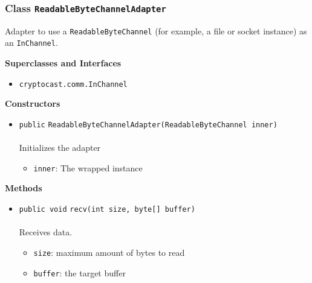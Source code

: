 \subsubsection{Class \lstinline|ReadableByteChannelAdapter|}
Adapter to use a \lstinline|ReadableByteChannel| (for example, a file or socket instance) as an
 \lstinline|InChannel|. \\
\noindent\begin{minipage}[t]{5cm}
\vspace{0.3em}
\hspace*{2em}
\vspace{0.3em}
\end{minipage}



\textbf{\sffamily Superclasses and Interfaces}
\begin{itemize}
\item \lstinline|cryptocast.comm.InChannel|
\end{itemize}


\textbf{\sffamily Constructors}
\begin{itemize}
\item \lstinline|public| \lstinline|ReadableByteChannelAdapter|\lstinline|(ReadableByteChannel inner)|\\ \\[-0.6em]
Initializes the adapter
\begin{itemize}
\item \lstinline|inner|: The wrapped instance
\end{itemize}



\end{itemize}


\textbf{\sffamily Methods}
\begin{itemize}
\item \lstinline|public void| \lstinline|recv|\lstinline|(int size, byte[] buffer)|\\ \\[-0.6em]
Receives data.
\begin{itemize}
\item \lstinline|size|: maximum amount of bytes to read
\item \lstinline|buffer|: the target buffer
\end{itemize}



\end{itemize}

